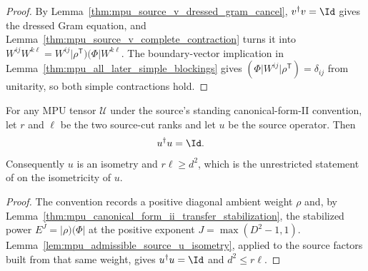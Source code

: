 \begin{proof}\leanok
    By Lemma~\ref{thm:mpu_source_v_dressed_gram_cancel}, $v^\dagger v=\Id$
    gives the dressed Gram equation, and
    Lemma~\ref{thm:mpu_source_v_complete_contraction} turns it into
    $W^{ij}W^{k\ell}=W^{ij}\lvert\rho^{\mathsf T})(\Phi\rvert W^{k\ell}$.
    The boundary-vector implication in
    Lemma~\ref{thm:mpu_all_later_simple_blockings} gives
    $(\Phi\rvert W^{ij}\lvert\rho^{\mathsf T})=\delta_{ij}$ from unitarity,
    so both simple contractions hold.
\end{proof}

\begin{lemma}
    \label{lemuisometry}
    \leanok
    For any MPU tensor $\mathcal U$ under the source's standing
    canonical-form-II convention, let $r$ and $\ell$ be the two source-cut
    ranks and let $u$ be the source operator. Then
    \begin{align}
        u^\dagger u & =\Id.
    \end{align}
    Consequently $u$ is an isometry and $r\ell\geq d^2$, which is the
    unrestricted statement of \cite[Lemma~III.7]{Cirac2017MPU} on the isometricity of $u$.
\end{lemma}

\begin{proof}\leanok
    The convention records a positive diagonal ambient weight $\rho$ and,
    by Lemma~\ref{thm:mpu_canonical_form_ii_transfer_stabilization}, the
    stabilized power $E^J=\lvert\rho)(\Phi\rvert$ at the positive exponent
    $J=\max(D^2-1,1)$. Lemma~\ref{lem:mpu_admissible_source_u_isometry},
    applied to the source factors built from that same weight, gives
    $u^\dagger u=\Id$ and $d^2\le r\ell$.
\end{proof}

